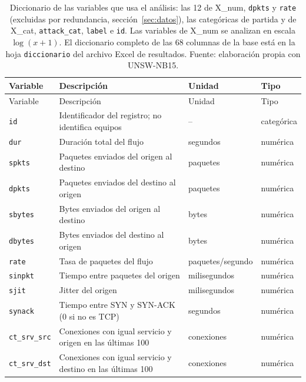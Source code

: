 \begingroup\footnotesize\setlength{\tabcolsep}{4pt}\renewcommand{\arraystretch}{1.1}
\begin{longtable}{@{}>{\raggedright\arraybackslash}p{3.6cm}>{\raggedright\arraybackslash}p{6.6cm}>{\raggedright\arraybackslash}p{2.8cm}>{\raggedright\arraybackslash}p{1.8cm}@{}}
\caption[Diccionario de las variables usadas en el análisis]{Diccionario de las variables que usa el análisis: las 12 de X\_num, \texttt{dpkts} y \texttt{rate} (excluidas por redundancia, sección~\ref{sec:datos}), las categóricas de partida y de X\_cat, \texttt{attack\_cat}, \texttt{label} e \texttt{id}. Las variables de X\_num se analizan en escala $\log(x+1)$. El diccionario completo de las 68 columnas de la base está en la hoja \texttt{diccionario} del archivo Excel de resultados. Fuente: elaboración propia con UNSW-NB15.}\label{tab:a-diccionario}\\
\toprule
Variable & Descripción & Unidad & Tipo \\
\midrule
\endfirsthead
\toprule
Variable & Descripción & Unidad & Tipo \\
\midrule
\endhead
\bottomrule
\endfoot
\bottomrule
\endlastfoot
\texttt{id} & Identificador del registro; no identifica equipos & -- & categórica \\
\texttt{dur} & Duración total del flujo & segundos & numérica \\
\texttt{spkts} & Paquetes enviados del origen al destino & paquetes & numérica \\
\texttt{dpkts} & Paquetes enviados del destino al origen & paquetes & numérica \\
\texttt{sbytes} & Bytes enviados del origen al destino & bytes & numérica \\
\texttt{dbytes} & Bytes enviados del destino al origen & bytes & numérica \\
\texttt{rate} & Tasa de paquetes del flujo & paquetes/segundo & numérica \\
\texttt{sinpkt} & Tiempo entre paquetes del origen & milisegundos & numérica \\
\texttt{sjit} & Jitter del origen & milisegundos & numérica \\
\texttt{synack} & Tiempo entre SYN y SYN-ACK (0 si no es TCP) & segundos & numérica \\
\texttt{ct\_srv\_src} & Conexiones con igual servicio y origen en las últimas 100 & conexiones & numérica \\
\texttt{ct\_srv\_dst} & Conexiones con igual servicio y destino en las últimas 100 & conexiones & numérica \\

\end{longtable}
